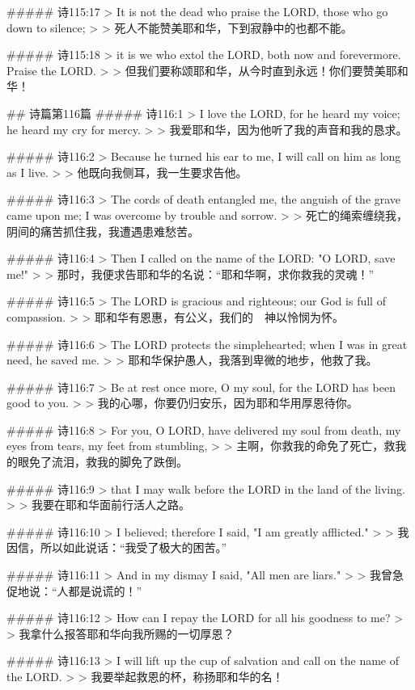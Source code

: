 ##### 诗115:17
> It is not the dead who praise the LORD, those who go down to silence;
>
> 死人不能赞美耶和华，下到寂静中的也都不能。


##### 诗115:18
> it is we who extol the LORD, both now and forevermore. Praise the LORD.
>
> 但我们要称颂耶和华，从今时直到永远！你们要赞美耶和华！


## 诗篇第116篇
##### 诗116:1
> I love the LORD, for he heard my voice; he heard my cry for mercy.
>
> 我爱耶和华，因为他听了我的声音和我的恳求。


##### 诗116:2
> Because he turned his ear to me, I will call on him as long as I live.
>
> 他既向我侧耳，我一生要求告他。


##### 诗116:3
> The cords of death entangled me, the anguish of the grave came upon me; I was overcome by trouble and sorrow.
>
> 死亡的绳索缠绕我，阴间的痛苦抓住我，我遭遇患难愁苦。


##### 诗116:4
> Then I called on the name of the LORD: "O LORD, save me!"
>
> 那时，我便求告耶和华的名说：“耶和华啊，求你救我的灵魂！”


##### 诗116:5
> The LORD is gracious and righteous; our God is full of compassion.
>
> 耶和华有恩惠，有公义，我们的　神以怜悯为怀。


##### 诗116:6
> The LORD protects the simplehearted; when I was in great need, he saved me.
>
> 耶和华保护愚人，我落到卑微的地步，他救了我。


##### 诗116:7
> Be at rest once more, O my soul, for the LORD has been good to you.
>
> 我的心哪，你要仍归安乐，因为耶和华用厚恩待你。


##### 诗116:8
> For you, O LORD, have delivered my soul from death, my eyes from tears, my feet from stumbling,
>
> 主啊，你救我的命免了死亡，救我的眼免了流泪，救我的脚免了跌倒。


##### 诗116:9
> that I may walk before the LORD in the land of the living.
>
> 我要在耶和华面前行活人之路。


##### 诗116:10
> I believed; therefore I said, "I am greatly afflicted."
>
> 我因信，所以如此说话：“我受了极大的困苦。”


##### 诗116:11
> And in my dismay I said, "All men are liars."
>
> 我曾急促地说：“人都是说谎的！”


##### 诗116:12
> How can I repay the LORD for all his goodness to me?
>
> 我拿什么报答耶和华向我所赐的一切厚恩？


##### 诗116:13
> I will lift up the cup of salvation and call on the name of the LORD.
>
> 我要举起救恩的杯，称扬耶和华的名！



